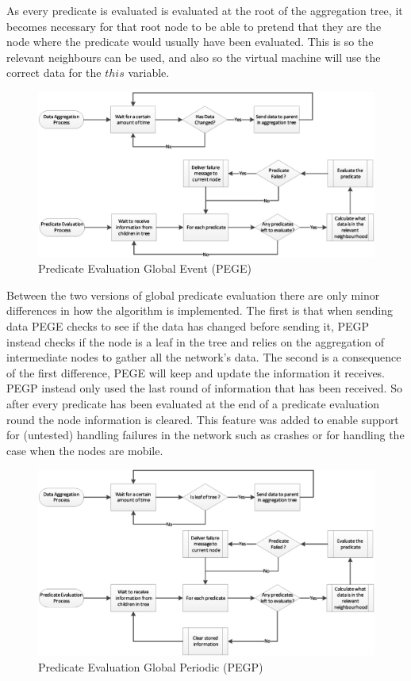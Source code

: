 As every predicate is evaluated is evaluated at the root of the aggregation tree, it becomes necessary for that root node to be able to pretend that they are the node where the predicate would usually have been evaluated. This is so the relevant neighbours can be used, and also so the virtual machine will use the correct data for the $this$ variable.

\begin{figure}[H]
\centering
\includegraphics[width=\linewidth]{Diagrams/pege.eps}
\caption{Predicate Evaluation Global Event (PEGE)}
\end{figure}

Between the two versions of global predicate evaluation there are only minor differences in how the algorithm is implemented. The first is that when sending data PEGE checks to see if the data has changed before sending it, PEGP instead checks if the node is a leaf in the tree and relies on the aggregation of intermediate nodes to gather all the network's data. The second is a consequence of the first difference, PEGE will keep and update the information it receives. PEGP instead only used the last round of information that has been received. So after every predicate has been evaluated at the end of a predicate evaluation round the node information is cleared. This feature was added to enable support for (untested) handling failures in the network such as crashes or for handling the case when the nodes are mobile.

\begin{figure}[H]
\centering
\includegraphics[width=\linewidth]{Diagrams/pegp.eps}
\caption{Predicate Evaluation Global Periodic (PEGP)}
\end{figure}


